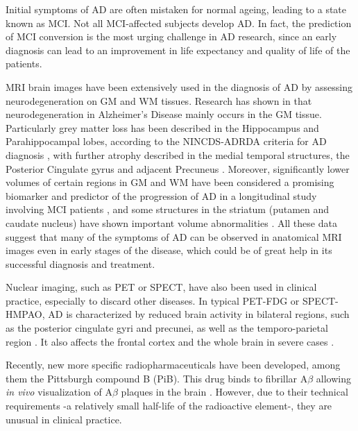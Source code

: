 Initial symptoms of \ac{AD} are often mistaken for normal ageing, leading to a state known as \acf{MCI}. Not all \ac{MCI}-affected subjects develop \ac{AD}. In fact, the prediction of \ac{MCI} conversion is the most urging challenge in \ac{AD} research, since an early diagnosis can lead to an improvement in life expectancy and quality of life of the patients. 

\ac{MRI} brain images have been extensively used in the diagnosis of \ac{AD} by assessing neurodegeneration on \ac{GM} and \ac{WM} tissues. Research has shown in \cite{Baron2001,Misra2009,Pievani2013,Dubois2007} that neurodegeneration in Alzheimer's Disease mainly occurs in the \ac{GM} tissue. Particularly grey matter loss has been described in the Hippocampus and Parahippocampal lobes, according to the NINCDS-ADRDA criteria for AD diagnosis \cite{Dubois2007}, with further atrophy described in the medial temporal structures, the Posterior Cingulate gyrus and adjacent Precuneus \cite{Baron2001}. Moreover, significantly lower volumes of certain regions in \ac{GM} and \ac{WM} have been considered a promising biomarker and predictor of the progression of \ac{AD} in a longitudinal study involving \ac{MCI} patients \cite{Misra2009}, and some structures in the striatum (putamen and caudate nucleus) have shown important volume abnormalities \cite{Pievani2013}. All these data suggest that many of the symptoms of \ac{AD} can be observed in anatomical \ac{MRI} images even in early stages of the disease, which could be of great help in its successful diagnosis and treatment. 

Nuclear imaging, such as \ac{PET} or \ac{SPECT}, have also been used in clinical practice, especially to discard other diseases. In typical \ac{PET}-FDG or \ac{SPECT}-HMPAO, \ac{AD} is characterized by reduced brain activity in bilateral regions, such as the posterior cingulate gyri and precunei, as well as the temporo-parietal region \cite{Claus1994}. It also affects the frontal cortex and the whole brain in severe cases \cite{Leon1983,Kogure2000}. 

Recently, new more specific radiopharmaceuticals have been developed, among them the Pittsburgh compound B (PiB). This drug binds to fibrillar A$\beta$ allowing \textit{in vivo} visualization of A$\beta$ plaques in the brain \cite{Ikonomovic2008}. However, due to their technical requirements -a relatively small half-life of the radioactive element-, they are unusual in clinical practice. 


